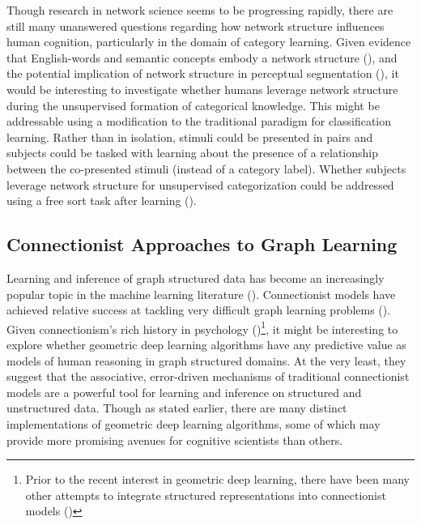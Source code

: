 \documentclass[12pt]{article}
\let\oldcite=\cite
\renewcommand{\cite}[1]{\textcolor[rgb]{0, .121, .388}{\oldcite{#1}}}
\begin{document}
Though research in network science seems to be progressing rapidly, there are still many unanswered questions regarding how network structure influences human cognition, particularly in the domain of category learning. Given evidence that English-words and semantic concepts embody a network structure (\cite{vitevitch2008can,steyvers2005large}), and the potential implication of network structure in perceptual segmentation (\cite{saffran1996statistical}), it would be interesting to investigate whether humans leverage network structure during the unsupervised formation of categorical knowledge. This might be addressable using a modification to the traditional paradigm for classification learning. Rather than in isolation, stimuli could be presented in pairs and subjects could be tasked with learning about the presence of a relationship between the co-presented stimuli (instead of a category label). Whether subjects leverage network structure for unsupervised categorization could be addressed using a free sort task after learning (\cite{medin1987family}).

\subsection{Connectionist Approaches to Graph Learning}

Learning and inference of graph structured data has become an increasingly popular topic in the machine learning literature (\cite{bronstein2017geometric}). Connectionist models have achieved relative success at tackling very difficult graph learning problems (\cite{kipf2016semi,graves2016hybrid,schlichtkrull2018modeling}). Given connectionism's rich history in psychology (\cite{mcclelland1987parallel,mcclelland2010letting,hummel2004solution})\footnote{Prior to the recent interest in geometric deep learning, there have been many other attempts to integrate structured representations into connectionist models (\cite{pollack1990recursive,smolensky1990tensor})}, it might be interesting to explore whether geometric deep learning algorithms have any predictive value as models of human reasoning in graph structured domains. At the very least, they suggest that the associative, error-driven mechanisms of traditional connectionist models are a powerful tool for learning and inference on structured and unstructured data. Though as stated earlier, there are many distinct implementations of geometric deep learning algorithms, some of which may provide more promising avenues for cognitive scientists than others. 
\end{document}
